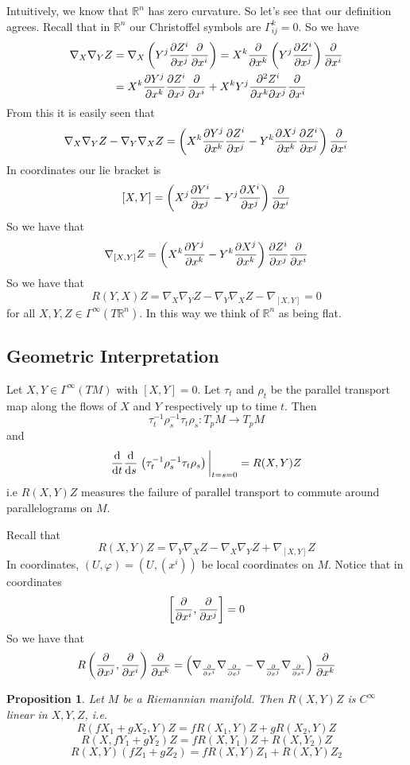 \documentclass[a4paper]{article}
\newtheorem*{prop}{Proposition}
\begin{document}
Intuitively, we know that $\mathds{R}^n$ has zero curvature. So let's see that our definition agrees. Recall that in $\mathds{R}^n$ our Christoffel symbols are $\Gamma_{ij}^k = 0$. So we have
\[
  \begin{aligned}
    \nabla_X \nabla_Y Z &= \nabla_X \left( Y^j \pdv{Z^i}{x^j} \pdv{x^i} \right) = X^k \pdv{x^k} \left( Y^j \pdv{Z^i}{x^j} \right) \pdv{x^i} \\
                        &= X^k \pdv{Y^j}{x^k} \pdv{Z^i}{x^j} \pdv{x^i} + X^k Y^j \pdv[2]{Z^i}{x^k}{x^j} \pdv{x^i}
  \end{aligned}
\]
From this it is easily seen that
\[
  \nabla_X \nabla_Y Z - \nabla_Y \nabla_X Z = \left( X^k \pdv{Y^j}{x^k} \pdv{Z^i}{x^j} - Y^k \pdv{X^j}{x^k} \pdv{Z^i}{x^j} \right) \pdv{x^i}
\]
In coordinates our lie bracket is
\[
  [X,Y] = \left(X^j \pdv{Y^i}{x^j} - Y^j\pdv{X^i}{x^j} \right)\pdv{x^i}
\]
So we have that
\[
  \nabla_{[X,Y]} Z = \left( X^k \pdv{Y^j}{x^k} - Y^k \pdv{X^j}{x^k} \right) \pdv{Z^i}{x^j} \pdv{x^i}
\]
So we have that
\[
  R(Y,X)Z = \nabla_X \nabla _Y Z - \nabla_Y \nabla_X Z - \nabla_{[X,Y]} = 0
\]
for all $X,Y,Z \in \Gamma^{\infty}(T\mathds{R}^n)$. In this way we think of $\mathds{R}^n$ as being flat.

\subsection*{Geometric Interpretation}%
Let $X,Y \in \Gamma^{\infty}(TM)$ with $[X,Y] = 0$. Let $\tau_t$ and $\rho_t$ be the parallel transport map along the flows of $X$ and $Y$ respectively up to time $t$.  Then
\[
  \tau_t^{-1}\rho_s^{-1} \tau_t \rho_s: T_pM \rightarrow T_pM
\]
and
\[
  \dv{t}\dv{s} \eval{\left(\tau_t^{-1}\rho_s^{-1} \tau_t \rho_s \right)}_{t=s=0} = R(X,Y)Z
\]
i.e $R(X,Y)Z$ measures the failure of parallel transport to commute around parallelograms on $M$.


Recall that
\[
  R(X,Y)Z = \nabla_Y \nabla_X Z - \nabla_X \nabla_Y Z + \nabla_{[X,Y]} Z
\]
In coordinates, $(U, \varphi)= (U, (x^i))$ be local coordinates on $M$. Notice that in coordinates
\[
  \left[ \pdv{x^i}, \pdv{x^j} \right] = 0
\]
So we have that
\[
  R \left( \pdv{x^j}, \pdv{x^i} \right) \pdv{x^k} = \left(\nabla_{\pdv{x^i}} \nabla_{\pdv{x^j}} - \nabla_{\pdv{x^j}}\nabla_{\pdv{x^i}}\right) \pdv{x^k}
\]

\begin{prop}
 Let $M$ be a Riemannian manifold.  Then $R(X,Y)Z$ is $C^{\infty}$ linear in $X,Y,Z$, i.e.
     \[
       R(fX_1 + gX_2, Y)Z = fR(X_1,Y)Z + gR(X_2, Y)Z
     \]
     \[
       R(X, fY_1+gY_2)Z = fR(X,Y_1)Z + R(X, Y_2)Z
     \]
     \[
       R(X, Y)(fZ_1 + gZ_2) = fR(X,Y)Z_1 + R(X, Y)Z_2
     \]
\end{prop}
\end{document}
